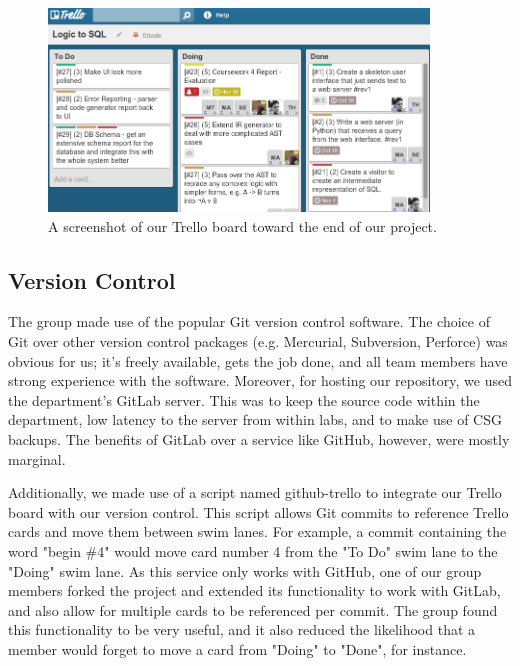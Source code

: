 \documentclass[a4paper, 11pt]{article}
\begin{document}
    \begin{figure}[H]
      \centering
      \includegraphics[width=0.9\textwidth]{images/trello.png}
      \caption{A screenshot of our Trello board toward the end of our project.}
    \end{figure}

  \subsection{Version Control}
    The group made use of the popular Git\cite{git} version control software.
    The choice of Git over other version control packages (e.g. Mercurial,
    Subversion, Perforce) was obvious for us; it's freely available, gets the
    job done, and all team members have strong experience with the software.
    Moreover, for hosting our repository, we used the department's GitLab
    server. This was to keep the source code within the department, low
    latency to the server from within labs, and to make use of CSG backups. The
    benefits of GitLab over a service like GitHub, however, were mostly
    marginal.

    Additionally, we made use of a script named
    github-trello\cite{githubtrello} to integrate our Trello board with our
    version control. This script allows Git commits to reference Trello cards
    and move them between swim lanes. For example, a commit containing the word
    "begin \#4" would move card number 4 from the "To Do" swim lane to the
    "Doing" swim lane. As this service only works with GitHub, one of our group
    members forked the project\cite{tedtrello} and extended its functionality 
    to work with GitLab, and also allow for multiple cards to be referenced per
    commit. The group found this functionality to be very useful, and it also
    reduced the likelihood that a member would forget to move a card from
    "Doing" to "Done", for instance.
\end{document}
